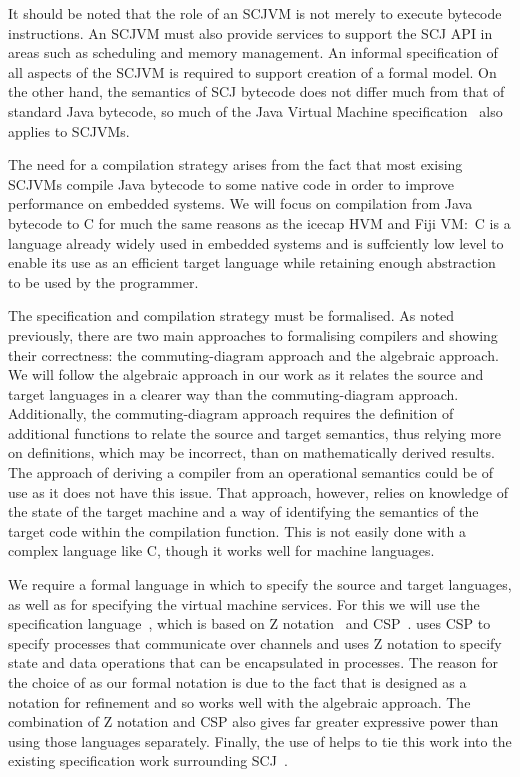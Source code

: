 \documentclass[a4paper,10pt]{report}
\begin{document}
It should be noted that the role of an SCJVM is not merely to execute
bytecode instructions.
An SCJVM must also provide services to support the SCJ API in areas
such as scheduling and memory management.
An informal specification of all aspects of the SCJVM is required to
support creation of a formal model.
On the other hand, the semantics of SCJ bytecode does not differ much
from that of standard Java bytecode, so much of the Java Virtual
Machine specification~\cite{lindholm2014} also applies to SCJVMs.

The need for a compilation strategy arises from the fact that most
exising SCJVMs compile Java bytecode to some native code in order to
improve performance on embedded systems.
We will focus on compilation from Java bytecode to C for much the same
reasons as the icecap HVM and Fiji VM:~C is a language already widely
used in embedded systems and is suffciently low level to enable its
use as an efficient target language while retaining enough abstraction
to be used by the programmer.

The specification and compilation strategy must be formalised.
As noted previously, there are two main approaches to formalising
compilers and showing their correctness: the commuting-diagram
approach and the algebraic approach.
We will follow the algebraic approach in our work as it relates the
source and target languages in a clearer way than the
commuting-diagram approach.
Additionally, the commuting-diagram approach requires the definition
of additional functions to relate the source and target semantics,
thus relying more on definitions, which may be incorrect, than on
mathematically derived results.
The approach of deriving a compiler from an operational semantics
could be of use as it does not have this issue.
That approach, however, relies on knowledge of the state of the target
machine and a way of identifying the semantics of the target code
within the compilation function.
This is not easily done with a complex language like C, though it
works well for machine languages.

We require a formal language in which to specify the source and target
languages, as well as for specifying the virtual machine services.
For this we will use the \Circus{} specification
language~\cite{oliveira2009}, which is based on Z
notation~\cite{woodcock1996} and CSP~\cite{roscoe2011}.
\Circus{} uses CSP to specify processes that communicate over channels
and uses Z notation to specify state and data operations that can be
encapsulated in processes.
The reason for the choice of \Circus{} as our formal notation is due
to the fact that \Circus{} is designed as a notation for refinement
and so works well with the algebraic approach.
The combination of Z notation and CSP also gives far greater
expressive power than using those languages separately.
Finally, the use of \Circus{} helps to tie this work into the existing
specification work surrounding SCJ~\cite{cavalcanti2011,
  cavalcanti2011a, cavalcanti2013, zeyda2011}.
\end{document}
